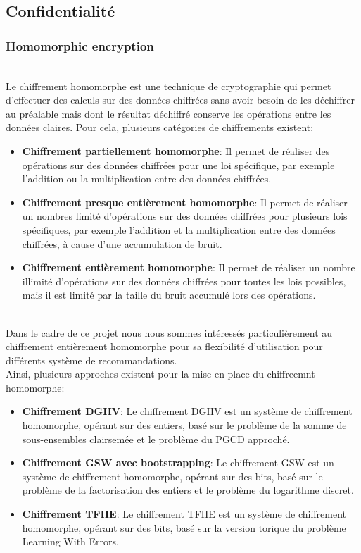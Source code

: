 \documentclass{article}
\begin{document}
    \subsection{Confidentialité}
    \subsubsection{Homomorphic encryption}
    $ $\\
    Le chiffrement homomorphe est une technique de cryptographie qui permet d'effectuer des calculs sur des données chiffrées sans avoir besoin de les déchiffrer au préalable mais dont le résultat déchiffré conserve les opérations entre les données claires.
    Pour cela, plusieurs catégories de chiffrements existent:\\
    \begin{itemize}
        \item \textbf{Chiffrement partiellement homomorphe}: Il permet de réaliser des opérations sur des données chiffrées pour une loi spécifique, par exemple l'addition ou la multiplication entre des données chiffrées.
        \item \textbf{Chiffrement presque entièrement homomorphe}: Il permet de réaliser un nombres limité d'opérations sur des données chiffrées pour plusieurs lois spécifiques, par exemple l'addition et la multiplication entre des données chiffrées, à cause d'une accumulation de bruit.
        \item \textbf{Chiffrement entièrement homomorphe}: Il permet de réaliser un nombre illimité d'opérations sur des données chiffrées pour toutes les lois possibles, mais il est limité par la taille du bruit accumulé lors des opérations.
    \end{itemize}
    $ $\\
    Dans le cadre de ce projet nous nous sommes intéressés particulièrement au chiffrement entièrement homomorphe pour sa flexibilité d'utilisation pour différents système de recommandations.\\
    Ainsi, plusieurs approches existent pour la mise en place du chiffreemnt homomorphe: \\
    \begin{itemize}
        \item \textbf{Chiffrement DGHV}: Le chiffrement DGHV est un système de chiffrement homomorphe, opérant sur des entiers, basé sur le problème de la somme de sous-ensembles clairsemée et le problème du PGCD approché.
        \item \textbf{Chiffrement GSW avec bootstrapping}: Le chiffrement GSW est un système de chiffrement homomorphe, opérant sur des bits, basé sur le problème de la factorisation des entiers et le problème du logarithme discret.
        \item \textbf{Chiffrement TFHE}: Le chiffrement TFHE est un système de chiffrement homomorphe, opérant sur des bits, basé sur la version torique du problème Learning With Errors.
    \end{itemize}
\end{document}
